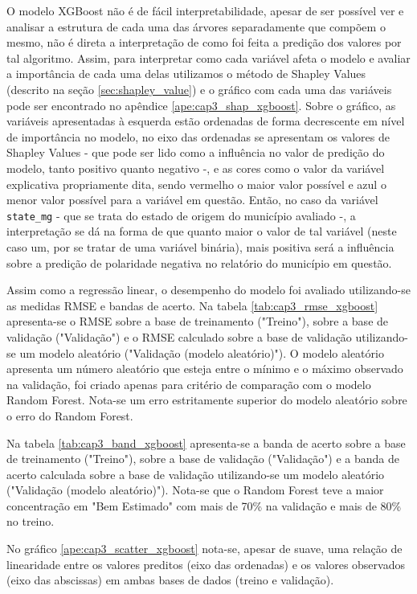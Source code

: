 O modelo XGBoost não é de fácil interpretabilidade, apesar de ser possível ver e analisar a estrutura de cada uma das árvores separadamente que compõem o mesmo, não é direta a interpretação de como foi feita a predição dos valores por tal algoritmo. Assim, para interpretar como cada variável afeta o modelo e avaliar a importância de cada uma delas utilizamos o método de Shapley Values (descrito na seção \ref{sec:shapley_value}) e o gráfico com cada uma das variáveis pode ser encontrado no apêndice \ref{ape:cap3_shap_xgboost}. Sobre o gráfico, as variáveis apresentadas à esquerda estão ordenadas de forma decrescente em nível de importância no modelo, no eixo das ordenadas se apresentam os valores de Shapley Values - que pode ser lido como a influência no valor de predição do modelo, tanto positivo quanto negativo -, e as cores como o valor da variável explicativa propriamente dita, sendo vermelho o maior valor possível e azul o menor valor possível para a variável em questão. Então, no caso da variável \verb|state_mg| - que se trata do estado de origem do município avaliado -, a interpretação se dá na forma de que quanto maior o valor de tal variável (neste caso um, por se tratar de uma variável binária), mais positiva será a influência sobre a predição de polaridade negativa no relatório do município em questão.

Assim como a regressão linear, o desempenho do modelo foi avaliado utilizando-se as medidas RMSE e bandas de acerto. Na tabela \ref{tab:cap3_rmse_xgboost} apresenta-se o RMSE sobre a base de treinamento ("Treino"), sobre a base de validação ("Validação") e o RMSE calculado sobre a base de validação utilizando-se um modelo aleatório ("Validação (modelo aleatório)"). O modelo aleatório apresenta um número aleatório que esteja entre o mínimo e o máximo observado na validação, foi criado apenas para critério de comparação com o modelo Random Forest. Nota-se um erro estritamente superior do modelo aleatório sobre o erro do Random Forest.

Na tabela \ref{tab:cap3_band_xgboost} apresenta-se a banda de acerto sobre a base de treinamento ("Treino"), sobre a base de validação ("Validação") e a banda de acerto calculada sobre a base de validação utilizando-se um modelo aleatório ("Validação (modelo aleatório)"). Nota-se que o Random Forest teve a maior concentração em "Bem Estimado" com mais de 70\% na validação e mais de 80\% no treino.

No gráfico \ref{ape:cap3_scatter_xgboost} nota-se, apesar de suave, uma relação de linearidade entre os valores preditos (eixo das ordenadas) e os valores observados (eixo das abscissas) em ambas bases de dados (treino e validação).

